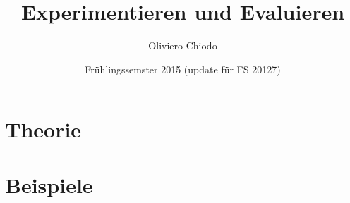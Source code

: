 \documentclass[a4paper]{article}
\title{Experimentieren und Evaluieren}
\author{Oliviero Chiodo}
\affil{Hochschule für Technik Rapperswil}
\date{Frühlingssemster 2015 (update für FS 20127) }
\begin{document}
\maketitle
\tableofcontents
\newpage
\section{Theorie}

\newpage
\section{Beispiele}

\end{document}
